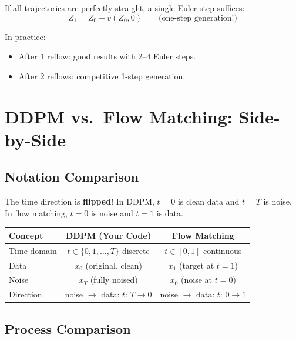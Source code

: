 \documentclass[11pt, a4paper]{article}
\begin{document}
If all trajectories are perfectly straight, a single Euler step suffices:
\begin{equation}
  \label{eq:one-step}
  Z_1 = Z_0 + v(Z_0, 0)
  \qquad \text{(one-step generation!)}
\end{equation}

In practice:
\begin{itemize}
  \item After 1 reflow: good results with 2--4 Euler steps.
  \item After 2 reflows: competitive 1-step generation.
\end{itemize}

\section{DDPM vs.\ Flow Matching: Side-by-Side}
\label{sec:comparison}

\subsection{Notation Comparison}

\begin{warningbox}
The time direction is \textbf{flipped}!  In DDPM, $t{=}0$ is clean data and
$t{=}T$ is noise.  In flow matching, $t{=}0$ is noise and $t{=}1$ is data.
\end{warningbox}

\begin{center}
\renewcommand{\arraystretch}{1.3}
\begin{tabular}{@{} l c c @{}}
\toprule
\textbf{Concept} & \textbf{DDPM (Your Code)} & \textbf{Flow Matching} \\
\midrule
Time domain & $t \in \{0, 1, \ldots, T\}$ discrete & $t \in [0, 1]$ continuous \\
Data & $x_0$ (original, clean) & $x_1$ (target at $t{=}1$) \\
Noise & $x_T$ (fully noised) & $x_0$ (noise at $t{=}0$) \\
Direction & noise $\to$ data: $t\!:\, T \to 0$ & noise $\to$ data: $t\!:\, 0 \to 1$ \\
\bottomrule
\end{tabular}
\end{center}

\subsection{Process Comparison}
\end{document}

